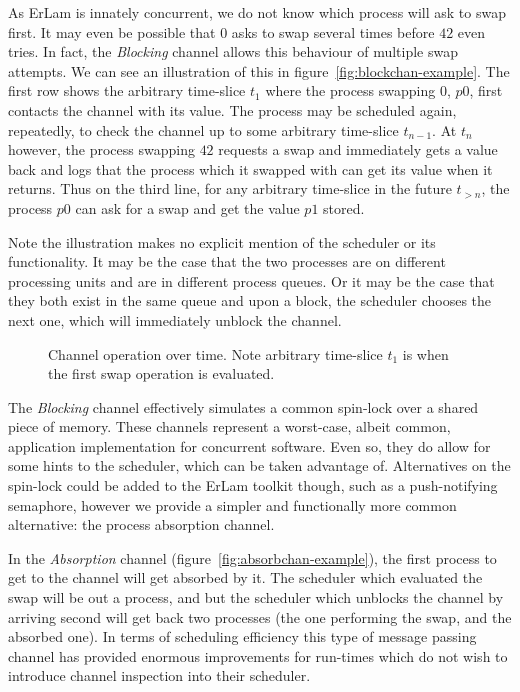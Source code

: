 As ErLam is innately concurrent, we do not know which process will ask to swap
first. It may even be possible that $0$ asks to swap several times before $42$
even tries. In fact, the {\sl Blocking} channel allows this behaviour of 
multiple swap attempts.
We can see an illustration of this in figure~\ref{fig:blockchan-example}.
The first row shows the arbitrary time-slice $t_1$ where the process swapping $0$, 
$p0$, first contacts the channel with its value. The process may be scheduled again,
repeatedly, to check the channel up to some arbitrary time-slice $t_{n-1}$. At
$t_n$ however, the process swapping $42$ requests a swap and immediately gets a
value back and logs that the process which it swapped with can get its value
when it returns. Thus on the third line, for any arbitrary time-slice in the 
future $t_{>n}$, the process $p0$ can ask for a swap and get the value $p1$ 
stored.

Note the illustration makes no explicit mention of the scheduler or its 
functionality. It may be the case that the two processes are on different 
processing units and are in different process queues. 
Or it may be the case that they both exist in the
same queue and upon a block, the scheduler chooses the next one, which will 
immediately unblock the channel.

\begin{figure}
\caption{Channel operation over time. Note arbitrary time-slice $t_1$ is when the 
first swap operation is evaluated.}
\end{figure}

The {\sl Blocking} channel effectively simulates a common spin-lock over a shared 
piece of memory. These channels represent a worst-case, albeit common, application 
implementation for concurrent software. Even so, they do allow for some hints
to the scheduler, which can be taken advantage of. Alternatives on the spin-lock 
could be added to the ErLam toolkit though, such as a push-notifying semaphore, 
however we provide a simpler and functionally more common alternative: the process 
absorption channel.

In the {\sl Absorption} channel (figure~\ref{fig:absorbchan-example}), the first 
process to get to the channel will get absorbed by it. The scheduler which 
evaluated the swap will be out a process, and but the scheduler which unblocks the channel 
by arriving second will get back two processes (the one performing the swap, 
and the absorbed one). In terms of scheduling efficiency this type of message
passing channel has provided enormous improvements for run-times which do not
wish to introduce channel inspection into their scheduler.

